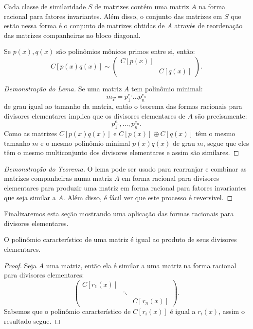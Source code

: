 \documentclass[11pt,twoside,a4paper]{book}
\begin{document}
\begin{teorema}
Cada classe de similaridade $S$ de matrizes contém uma matriz $A$ na forma racional para fatores invariantes. Além disso, o conjunto das matrizes em $S$ que estão nessa forma
é o conjunto de matrizes obtidas de $A$ através de reordenação das matrizes companheiras no bloco diagonal.
\end{teorema}

\begin{lema}
Se $p(x),q(x)$ são polinômios mônicos primos entre si, então:
\[
C[p(x)q(x)]\sim\begin{pmatrix}
C[p(x)]&\\&C[q(x)]
\end{pmatrix}.
\]
\end{lema}
\begin{proof}[Demonstração do Lema]
Se uma matriz $A$ tem polinômio minimal:
\[
m_T=p_1^{e_1}\dots p_n^{e_n}
\]
de grau igual ao tamanho da matria, então o teorema das formas racionais para divisores elementares implica que os divisores elementares de $A$ são precisamente:
\[
p_1^{e_1},\dots,p_n^{e_n}.
\]
Como as matrizes $C[p(x)q(x)]$ e $C[p(x)]\oplus C[q(x)]$ têm o mesmo tamanho $m$ e o mesmo polinômio minimal $p(x)q(x)$ de grau $m$, segue que eles têm o mesmo multiconjunto dos divisores elementares e assim são similares.
\end{proof}

\begin{proof}[Demonstração do Teorema]
O lema pode ser usado para rearranjar e combinar as matrizes companheiras numa matriz $A$ em forma racional para divisores elementares para produzir uma matriz em forma racional para fatores invariantes que seja similar a $A$. Além disso, é fácil ver que este processo é reversível.
\end{proof}

\noindent
Finalizaremos esta seção mostrando uma aplicação das formas racionais para divisores elementares.

\begin{teorema}
O polinômio característico de uma matriz é igual ao produto de seus divisores elementares.
\end{teorema}
\begin{proof}
Seja $A$ uma matriz, então ela é similar a uma matriz na forma racional para divisores elementares:
\[
\begin{pmatrix}
C[r_1(x)]&&\\&\ddots&\\&&C[r_n(x)]
\end{pmatrix}.
\]
Sabemos que o polinômio característico de $C[r_i(x)]$ é igual a $r_i(x)$, assim o resultado segue.
\end{proof}
\end{document}
